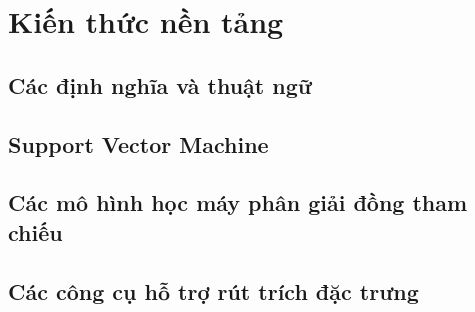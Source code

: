 \chapter{Kiến thức nền tảng}
\section{Các định nghĩa và thuật ngữ}
\section{Support Vector Machine}
\section{Các mô hình học máy phân giải đồng tham chiếu}
\section{Các công cụ hỗ trợ rút trích đặc trưng}
